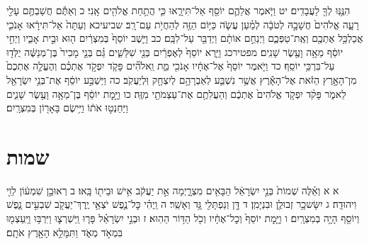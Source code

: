 \documentclass[twoside, openany, parskip=half, 11pt]{book}
\begin{document}
הִנֶּ֥נּֽוּ לְךָ֖ לַעֲבָדִֽים׃ יט וַיֹּ֧אמֶר אֲלֵהֶ֛ם יוֹסֵ֖ף אַל־תִּירָ֑אוּ כִּ֛י הֲתַ֥חַת אֱלֹהִ֖ים אָֽנִי׃ כ וְאַתֶּ֕ם חֲשַׁבְתֶּ֥ם עָלַ֖י רָעָ֑ה אֱלֹהִים֙ חֲשָׁבָ֣הּ לְטֹבָ֔ה לְמַ֗עַן עֲשֹׂ֛ה כַּיּ֥וֹם הַזֶּ֖ה לְהַחֲיֹ֥ת עַם־רָֽב׃ שביעיכא וְעַתָּה֙ אַל־תִּירָ֔אוּ אָנֹכִ֛י אֲכַלְכֵּ֥ל אֶתְכֶ֖ם וְאֶֽת־טַפְּכֶ֑ם וַיְנַחֵ֣ם אוֹתָ֔ם וַיְדַבֵּ֖ר עַל־לִבָּֽם׃ כב וַיֵּ֤שֶׁב יוֹסֵף֙ בְּמִצְרַ֔יִם ה֖וּא וּבֵ֣ית אָבִ֑יו וַיְחִ֣י יוֹסֵ֔ף מֵאָ֥ה וָעֶ֖שֶׂר שָׁנִֽים׃ מפטירכג וַיַּ֤רְא יוֹסֵף֙ לְאֶפְרַ֔יִם בְּנֵ֖י שִׁלֵּשִׁ֑ים גַּ֗ם בְּנֵ֤י מָכִיר֙ בֶּן־מְנַשֶּׁ֔ה יֻלְּד֖וּ עַל־בִּרְכֵּ֥י יוֹסֵֽף׃ כד וַיֹּ֤אמֶר יוֹסֵף֙ אֶל־אֶחָ֔יו אָנֹכִ֖י מֵ֑ת וֵֽאלֹהִ֞ים פָּקֹ֧ד יִפְקֹ֣ד אֶתְכֶ֗ם וְהֶעֱלָ֤ה אֶתְכֶם֙ מִן־הָאָ֣רֶץ הַזֹּ֔את אֶל־הָאָ֕רֶץ אֲשֶׁ֥ר נִשְׁבַּ֛ע לְאַבְרָהָ֥ם לְיִצְחָ֖ק וּֽלְיַעֲקֹֽב׃ כה וַיַּשְׁבַּ֣ע יוֹסֵ֔ף אֶת־בְּנֵ֥י יִשְׂרָאֵ֖ל לֵאמֹ֑ר פָּקֹ֨ד יִפְקֹ֤ד אֱלֹהִים֙ אֶתְכֶ֔ם וְהַעֲלִתֶ֥ם אֶת־עַצְמֹתַ֖י מִזֶּֽה׃ כו וַיָּ֣מׇת יוֹסֵ֔ף בֶּן־מֵאָ֥ה וָעֶ֖שֶׂר שָׁנִ֑ים וַיַּחַנְט֣וּ אֹת֔וֹ וַיִּ֥ישֶׂם בָּאָר֖וֹן בְּמִצְרָֽיִם׃ 

	
\chapter[שמות]{ שמות }
א א וְאֵ֗לֶּה שְׁמוֹת֙ בְּנֵ֣י יִשְׂרָאֵ֔ל הַבָּאִ֖ים מִצְרָ֑יְמָה אֵ֣ת יַעֲקֹ֔ב אִ֥ישׁ וּבֵית֖וֹ בָּֽאוּ׃ ב רְאוּבֵ֣ן שִׁמְע֔וֹן לֵוִ֖י וִיהוּדָֽה׃ ג יִשָּׂשכָ֥ר זְבוּלֻ֖ן וּבִנְיָמִֽן׃ ד דָּ֥ן וְנַפְתָּלִ֖י גָּ֥ד וְאָשֵֽׁר׃ ה וַֽיְהִ֗י כׇּל־נֶ֛פֶשׁ יֹצְאֵ֥י יֶֽרֶךְ־יַעֲקֹ֖ב שִׁבְעִ֣ים נָ֑פֶשׁ וְיוֹסֵ֖ף הָיָ֥ה בְמִצְרָֽיִם׃ ו וַיָּ֤מׇת יוֹסֵף֙ וְכׇל־אֶחָ֔יו וְכֹ֖ל הַדּ֥וֹר הַהֽוּא׃ ז וּבְנֵ֣י יִשְׂרָאֵ֗ל פָּר֧וּ וַֽיִּשְׁרְצ֛וּ וַיִּרְבּ֥וּ וַיַּֽעַצְמ֖וּ בִּמְאֹ֣ד מְאֹ֑ד וַתִּמָּלֵ֥א הָאָ֖רֶץ אֹתָֽם׃
\end{document}

